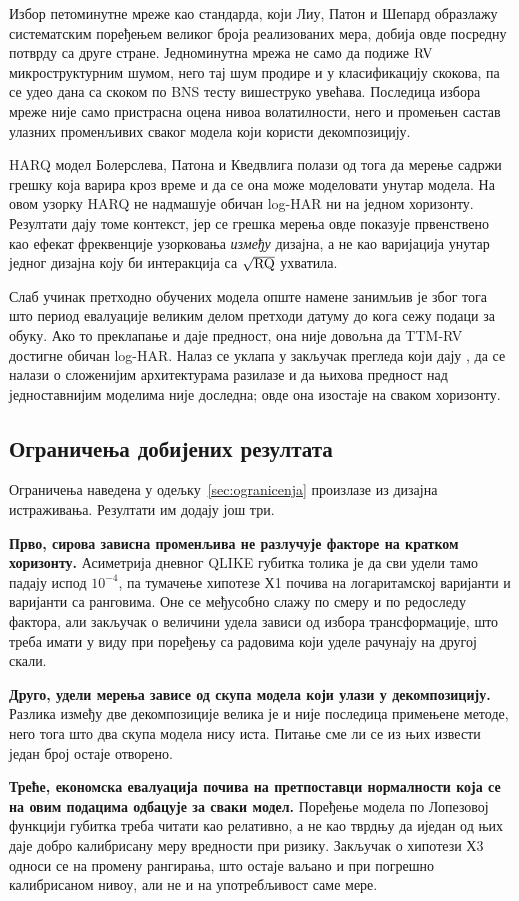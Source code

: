 Избор петоминутне мреже као стандарда, који Лиу, Патон и Шепард \parencite{lps2015}
образлажу систематским поређењем великог броја реализованих мера, добија овде посредну
потврду са друге стране. Једноминутна мрежа не само да подиже $\mathrm{RV}$ микроструктурним
шумом, него тај шум продире и у класификацију скокова, па се удео дана са скоком по BNS
тесту вишеструко увећава. Последица избора мреже није само пристрасна оцена нивоа
волатилности, него и промењен састав улазних променљивих сваког модела који користи
декомпозицију.

HARQ модел Болерслева, Патона и Кведвлига \parencite{bpq2016} полази од тога да мерење
садржи грешку која варира кроз време и да се она може моделовати унутар модела. На овом
узорку HARQ не надмашује обичан log-HAR ни на једном хоризонту. Резултати дају томе
контекст, јер се грешка мерења овде показује првенствено као ефекат фреквенције
узорковања \emph{између} дизајна, а не као варијација унутар једног дизајна коју би интеракција са
$\sqrt{\mathrm{RQ}}$ ухватила.

Слаб учинак претходно обучених модела опште намене занимљив је због тога што период
евалуације великим делом претходи датуму до кога сежу подаци за обуку. Ако то
преклапање и даје предност, она није довољна да TTM-RV достигне обичан log-HAR. Налаз се
уклапа у закључак прегледа који дају \textcite{leushuisPetkov2026}, да се налази о
сложенијим архитектурама разилазе и да њихова предност над једноставнијим моделима није
доследна; овде она изостаје на сваком хоризонту.

\subsection{Ограничења добијених резултата}

Ограничења наведена у одељку~\ref{sec:ogranicenja} произлазе из дизајна истраживања.
Резултати им додају још три.

\textbf{Прво, сирова зависна променљива не разлучује факторе на кратком хоризонту.}
Асиметрија дневног QLIKE губитка толика је да сви удели тамо падају испод $10^{-4}$, па
тумачење хипотезе Х1 почива на логаритамској варијанти и варијанти са ранговима.
Оне се међусобно слажу по смеру и по редоследу фактора, али закључак о величини удела
зависи од избора трансформације, што треба имати у виду при поређењу са радовима који
уделе рачунају на другој скали.

\textbf{Друго, удели мерења зависе од скупа модела који улази у декомпозицију.} Разлика
између две декомпозиције велика је и није последица примењене методе, него тога што
два скупа модела нису иста. Питање сме ли се из њих извести један број остаје отворено.

\textbf{Треће, економска евалуација почива на претпоставци нормалности која се на овим
подацима одбацује за сваки модел.} Поређење модела по Лопезовој функцији губитка треба
читати као релативно, а не као тврдњу да иједан од њих даје добро калибрисану меру
вредности при ризику. Закључак о хипотези Х3 односи се на промену рангирања, што остаје
ваљано и при погрешно калибрисаном нивоу, али не и на употребљивост саме мере.
